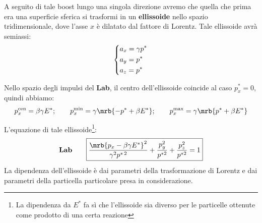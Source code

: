 A seguito di tale boost lungo una singola direzione avremo che quella che prima
era una superficie sferica si trasformi in un \textbf{ellissoide} nello spazio
tridimensionale, dove l'asse $x$ è dilatato dal fattore di Lorentz. Tale
ellissoide avrà semiassi:
\begin{align}
	\begin{dcases}
		a_x = \gamma p^\ast
		\\
		a_y = p^\ast
		\\
		a_z = p^\ast
	\end{dcases}
\end{align}

\begin{figure}[ht!]
	\centering
	\caption{}
\end{figure}

Nello spazio degli impulsi del \textbf{Lab}, il centro dell'ellissoide
coincide al caso $p_x ^{\ast} = 0$, quindi abbiamo:
\begin{equation}
	p_{x}^{\text{cen}} = \beta\gamma E^\ast;
	\qquad
	p_{x}^{\text{min}} = \gamma\mrb{-p^\ast + \beta E^\ast};
	\qquad
	p_{x}^{\text{max}} = \gamma\mrb{p^\ast + \beta E^\ast}
\end{equation}

L'equazione di tale ellissoide\footnote{
	La dipendenza da $E^\ast$ fa sì che l'ellissoide sia diverso per le
	particelle ottenute come prodotto di una certa reazione
}:
\begin{align}
	\textbf{Lab}
	\qquad
	\boxed{
		\frac{\mrb{p_x - \beta \gamma E^\ast}^2}{\gamma^2 p^{\ast\, 2}}
		+ \frac{p_y^2}{p^{\ast2}}
		+ \frac{p_z^2}{p^{\ast2}}
		= 1
	}
\end{align}
La dipendenza dell'ellissoide è dai parametri della trasformazione di Lorentz e
dai parametri della particella particolare presa in considerazione.

